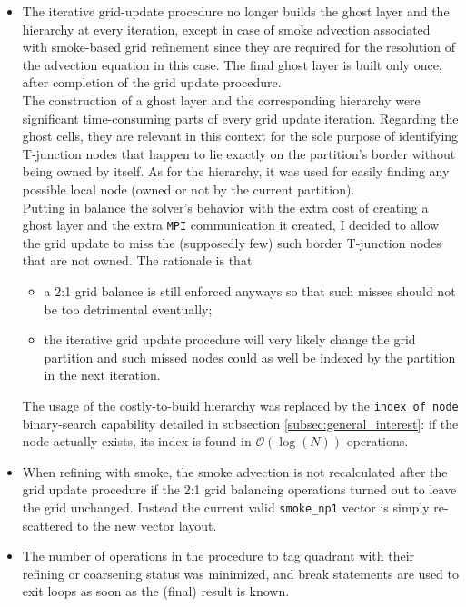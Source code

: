 \documentclass[11pt, a4paper]{article}
\theoremstyle{remark}
\begin{document}
\begin{itemize}
 \item The iterative grid-update procedure no longer builds the ghost layer and the hierarchy at every iteration, except in case of smoke advection associated with smoke-based grid refinement since they are required for the resolution of the advection equation in this case. The final ghost layer is built only once, after completion of the grid update procedure.\\ 
 The construction of a ghost layer and the corresponding hierarchy were significant time-consuming parts of every grid update iteration. Regarding the ghost cells, they are relevant in this context for the sole purpose of identifying T-junction nodes that happen to lie exactly on the partition's border without being owned by itself. As for the hierarchy, it was used for easily finding any possible local node (owned or not by the current partition).\\
 Putting in balance the solver's behavior with the extra cost of creating a ghost layer and the extra \verb|MPI| communication it created, I decided to allow the grid update to miss the (supposedly few) such border T-junction nodes that are not owned. The rationale is that 
 \begin{itemize}
  \item a 2:1 grid balance is still enforced anyways so that such misses should not be too detrimental eventually;
  \item the iterative grid update procedure will very likely change the grid partition and such missed nodes could as well be indexed by the partition in the next iteration.
 \end{itemize}
 The usage of the costly-to-build hierarchy was replaced by the \verb|index_of_node| binary-search capability detailed in subsection \ref{subsec:general_interest}: if the node actually exists, its index is found in $\mathcal{O}\left( \log\left( N \right)\right)$ operations.
 \item When refining with smoke, the smoke advection is not recalculated after the grid update procedure if the 2:1 grid balancing operations turned out to leave the grid unchanged. Instead the current valid \verb|smoke_np1| vector is simply re-scattered to the new vector layout.
 \item The number of operations in the procedure to tag quadrant with their refining or coarsening status was minimized, and break statements are used to exit loops as soon as the (final) result is known.
\end{itemize}
\end{document}
